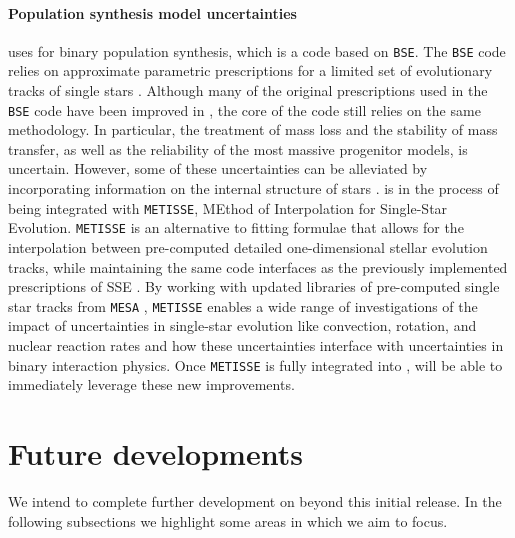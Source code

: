 \documentclass[twocolumn, twocolappendix, oneside, linenumbers]{aastex631}
\begin{document}
\paragraph{Population synthesis model uncertainties} \cogsworth uses \cosmic for binary population synthesis, which is a code based on \texttt{BSE}. The \texttt{BSE} code relies on approximate parametric prescriptions for a limited set of evolutionary tracks of single stars \citep{pols:98, Hurley+2000:2000MNRAS.315..543H,Hurley+2002}. Although many of the original prescriptions used in the \texttt{BSE} code have been improved in \cosmic \citep{COSMIC}, the core of the code still relies on the same methodology. In particular, the treatment of mass loss and the stability of mass transfer, as well as the reliability of the most massive progenitor models, is uncertain.
However, some of these uncertainties can be alleviated by incorporating information on the internal structure of stars \citep[e.g.,][]{Kruckow+2018:2018MNRAS.481.1908K, Fragos+2023:2023ApJS..264...45F}. \cosmic is in the process of being integrated with \texttt{METISSE}, MEthod of Interpolation for Single-Star Evolution. \texttt{METISSE} is an alternative to fitting formulae that allows for the interpolation between pre-computed detailed one-dimensional stellar evolution tracks, while maintaining the same code interfaces as the previously implemented prescriptions of SSE \citep{Agrawal+2020:2020MNRAS.497.4549A, Agrawal+2023}.
By working with updated libraries of pre-computed single star tracks from \texttt{MESA} \citep{Paxton2011, Paxton2013, Paxton2015, Paxton2018, Paxton2019, Jermyn2023}, \texttt{METISSE} enables a wide range of investigations of the impact of uncertainties in single-star evolution like convection, rotation, and nuclear reaction rates and how these uncertainties interface with uncertainties in binary interaction physics. Once \texttt{METISSE} is fully integrated into \cosmic, \cogsworth will be able to immediately leverage these new improvements.

\section{Future developments}\label{sec:future}

We intend to complete further development on \cogsworth beyond this initial release. In the following subsections we highlight some areas in which we aim to focus.
\end{document}
